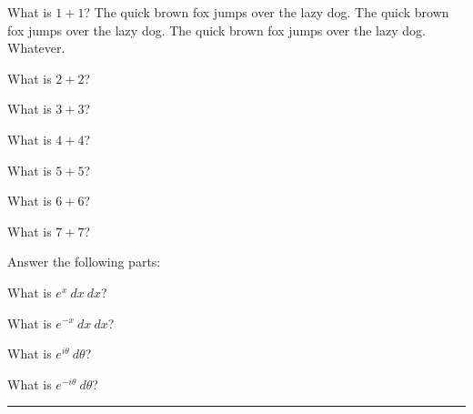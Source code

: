 \documentclass[10pt]{exam}%
\numberwithin{equation}{section}%
\begin{document}
\begin{multicols}{2}
\begin{questions}
\question[5] What is \(1+1\)? The quick brown fox jumps over the lazy dog. The quick brown fox jumps over the lazy dog. The quick brown fox jumps over the lazy dog. Whatever. \answerline%

\question[5] What is \(2+2\)? \answerline%


\question[5] What is \(3+3\)? \answerline%


\question[5] What is \(4+4\)? \answerline%


\question[5] What is \(5+5\)? \answerline%


\question[5] What is \(6+6\)? \answerline%


\question[5] What is \(7+7\)? \answerline%


\question Answer the following parts:

\question[6] What is \(e^{x}\ dx\ dx\)? \answerline%

\question[6] What is \(e^{-x}\ dx\ dx\)? \answerline%

\question[6] What is \(e^{i\theta}\ d\theta\)? \answerline%

\question[6] What is \(e^{-i\theta}\ d\theta\)? \answerline%

\end{questions}
\end{multicols}

\hrule

\begin{center}
\small \cellwidth{1em} \gradetable[h][questions]
\end{center}
\end{document}
